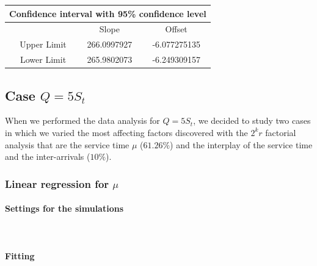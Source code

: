 \documentclass{article}
\begin{document}
                    \begin{table}[htbp!]
                        \centering 
                        \begin{tabular}{|c|c|c|}
                            
                            \hline
                            \multicolumn{3}{|c|}{\bf Confidence interval with 95\% confidence level} \\
                            
                            \hline
                            \ & Slope & Offset\\
                            \hline
                            \ Upper Limit & 266.0997927 & -6.077275135 \\ 
                            \hline
                            \ Lower Limit & 265.9802073 & -6.249309157 \\ 
                            \hline
                        \end{tabular}
                        \label{table:CI_1_fitting_delta-mu}
                    \end{table}
            
\newpage
        \subsection{Case $Q = 5S_t$}
            When we performed the data analysis for $Q = 5S_t$, we decided to study two cases in which we varied the most affecting factors discovered with the $2^k r$ factorial analysis that are the service time $\mu$ ($61.26\%$) and the interplay of the service time and the inter-arrivals ($10\%$). 
            
            \subsubsection{Linear regression for $\mu$}
                \paragraph{Settings for the simulations} \hfill \\
                    
                \paragraph{Fitting} \hfill \\
\end{document}
